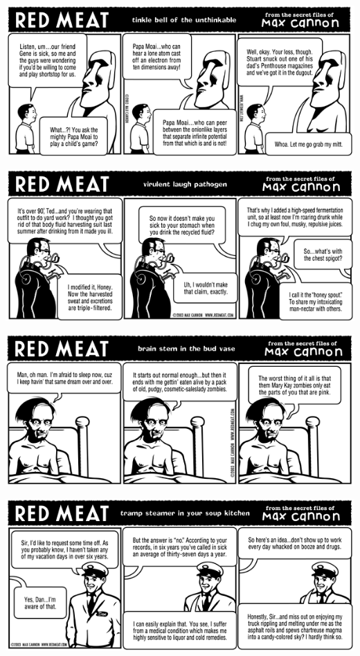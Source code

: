 \documentclass[a4paper,twoside,11pt]{article}
\begin{document}
\includegraphics[width=\textwidth]{redmeat_2003-08-05.png}



\includegraphics[width=\textwidth]{redmeat_2003-08-12.png}



\includegraphics[width=\textwidth]{redmeat_2003-08-19.png}



\includegraphics[width=\textwidth]{redmeat_2003-08-26.png}
\end{document}
